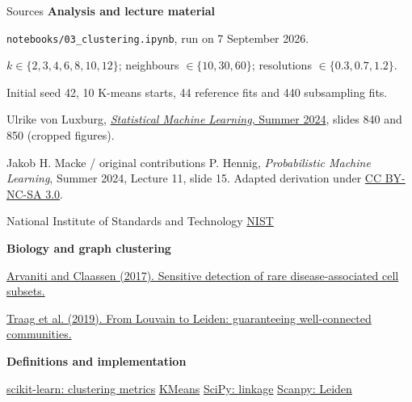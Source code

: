 \begin{frame}{Sources}
  \footnotesize
  \textbf{Analysis and lecture material}\par
  \texttt{notebooks/03\_clustering.ipynb}, run on 7 September 2026.\par
  $k\in\{2,3,4,6,8,10,12\}$; neighbours $\in\{10,30,60\}$; resolutions $\in\{0.3,0.7,1.2\}$.\par
  Initial seed 42, 10 K-means starts, 44 reference fits and 440 subsampling fits.\par
  Ulrike von Luxburg, \href{https://www.tml.cs.uni-tuebingen.de/teaching/2024_statistical_learning/downloads_free/vorlesung_main.pdf}{\emph{Statistical Machine Learning}, Summer 2024}, slides 840 and 850 (cropped figures).\par
  Jakob H. Macke / original contributions P. Hennig, \emph{Probabilistic Machine Learning}, Summer 2024, Lecture 11, slide 15. Adapted derivation under \href{https://creativecommons.org/licenses/by-nc-sa/3.0/}{CC BY-NC-SA 3.0}.\par
National Institute of Standards and Technology \href{https://www.itl.nist.gov/div898/software/dataplot/refman2/auxillar/iqrange.htm}{NIST} \par
  \vspace{2mm}
  \textbf{Biology and graph clustering}\par
  
  \href{https://doi.org/10.1038/ncomms14825}{Arvaniti and Claassen (2017). Sensitive detection of rare disease-associated cell subsets.}\par
  \href{https://doi.org/10.1038/s41598-019-41695-z}{Traag et al. (2019). From Louvain to Leiden: guaranteeing well-connected communities.}\par
  \vspace{2mm}
  \textbf{Definitions and implementation}\par
  \href{https://scikit-learn.org/stable/modules/clustering.html}{scikit-learn: clustering metrics}\quad
  \href{https://scikit-learn.org/stable/modules/generated/sklearn.cluster.KMeans.html}{KMeans}\quad
  \href{https://docs.scipy.org/doc/scipy/reference/generated/scipy.cluster.hierarchy.linkage.html}{SciPy: linkage}\quad
  \href{https://scanpy.readthedocs.io/en/stable/api/generated/scanpy.tl.leiden.html}{Scanpy: Leiden}
\end{frame}

